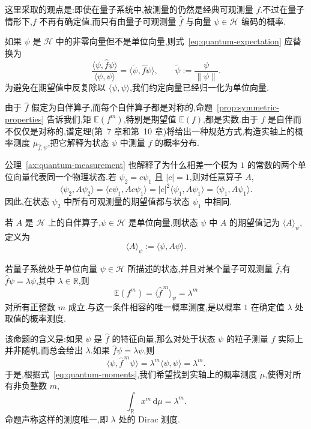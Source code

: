 这里采取的观点是:即使在量子系统中,被测量的仍然是经典可观测量 \(f\).不过在量子情形下,\(f\) 不再有确定值,而只有由量子可观测量 \(\widehat f\) 与向量 \(\psi\in\mathcal{H}\) 编码的概率.

如果 \(\psi\) 是 \(\mathcal{H}\) 中的非零向量但不是单位向量,则式~\eqref{eq:quantum-expectation} 应替换为
\[
\frac{\langle\psi,\widehat f\psi\rangle}{\langle\psi,\psi\rangle}
=\langle\widetilde\psi,\widehat f\widetilde\psi\rangle,
\qquad
\widetilde\psi:=\frac{\psi}{\|\psi\|}.
\]
为避免在期望值中反复除以 \(\langle\psi,\psi\rangle\),我们约定向量已经归一化为单位向量.

由于 \(\widehat f\) 假定为自伴算子,而每个自伴算子都是对称的,命题~\ref{prop:symmetric-properties} 告诉我们,矩 \(\mathbb{E}(f^{m})\),特别是期望值 \(\mathbb{E}(f)\),都是实数.由于 \(\widehat f\) 是自伴而不仅仅是对称的,谱定理(第~7 章和第~10 章)将给出一种规范方式,构造实轴上的概率测度 \(\mu_{\widehat f,\psi}\),把它解释为状态 \(\psi\) 中测量 \(f\) 的概率分布.

公理~\ref{ax:quantum-measurement} 也解释了为什么相差一个模为 \(1\) 的常数的两个单位向量代表同一个物理状态.若 \(\psi_{2}=c\psi_{1}\) 且 \(|c|=1\),则对任意算子 \(A\),
\[
\langle\psi_{2},A\psi_{2}\rangle
=\langle c\psi_{1},Ac\psi_{1}\rangle
=|c|^{2}\langle\psi_{1},A\psi_{1}\rangle
=\langle\psi_{1},A\psi_{1}\rangle.
\]
因此,在状态 \(\psi_{2}\) 中所有可观测量的期望值都与状态 \(\psi_{1}\) 中相同.

\begin{definition}[量子期望值的记号]\label{def:quantum-expectation-notation}
若 \(A\) 是 \(\mathcal{H}\) 上的自伴算子,\(\psi\in\mathcal{H}\) 是单位向量,则状态 \(\psi\) 中 \(A\) 的期望值记为 \(\langle A\rangle_{\psi}\),定义为
\[
\langle A\rangle_{\psi}:=\langle\psi,A\psi\rangle.
\]
\end{definition}

\begin{proposition}[特征向量]\label{prop:quantum-eigenvector}
若量子系统处于单位向量 \(\psi\in\mathcal{H}\) 所描述的状态,并且对某个量子可观测量 \(\widehat f\),有 \(\widehat f\psi=\lambda\psi\),其中 \(\lambda\in\mathbb{R}\),则
\begin{equation}
\mathbb{E}(f^{m})=\langle\widehat f^{\,m}\rangle_{\psi}=\lambda^{m}
\label{eq:eigenvector-moments}
\end{equation}
对所有正整数 \(m\) 成立.与这一条件相容的唯一概率测度,是以概率 \(1\) 在确定值 \(\lambda\) 处取值的概率测度.
\end{proposition}

该命题的含义是:如果 \(\psi\) 是 \(\widehat f\) 的特征向量,那么对处于状态 \(\psi\) 的粒子测量 \(f\) 实际上并非随机,而总会给出 \(\lambda\).如果 \(\widehat f\psi=\lambda\psi\),则
\[
\langle\psi,\widehat f^{\,m}\psi\rangle
=\lambda^{m}\langle\psi,\psi\rangle=\lambda^{m}.
\]
于是,根据式~\eqref{eq:quantum-moments},我们希望找到实轴上的概率测度 \(\mu\),使得对所有非负整数 \(m\),
\[
\int_{\mathbb{R}}x^{m}\,\mathrm{d}\mu=\lambda^{m}.
\]
命题声称这样的测度唯一,即 \(\lambda\) 处的 Dirac 测度.

